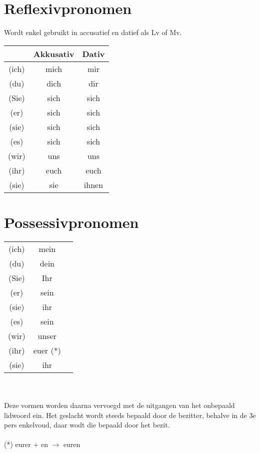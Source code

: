 \documentclass[main.tex]{subfiles}
\begin{document}
\section{Reflexivpronomen}
Wordt enkel gebruikt in accusatief en datief als Lv of Mv.\\
\begin{tabular}{|c|c|c|}
\rowcolor{gray}
\setlength\extrarowheight{8pt}
& Akkusativ & Dativ \\
\hline 
(ich) & mich & mir \\ 
(du) & dich & dir \\ 
(Sie) & sich & sich \\ 
(er) & sich & sich \\ 
(sie) & sich & sich \\ 
(es) & sich & sich \\ 
(wir) & uns & uns \\ 
(ihr) & euch & euch \\ 
(sie) & sie & ihnen \\ 
\hline
\end{tabular} 

\section{Possessivpronomen}
\begin{tabular}{|c|c|c|}
\rowcolor{gray}
(ich) & mein \\ 
(du) & dein \\ 
(Sie) & Ihr \\ 
(er) & sein \\ 
(sie) & ihr \\ 
(es) & sein \\ 
(wir) & unser \\ 
(ihr) & euer (*) \\ 
(sie) & ihr \\ 
\hline
\end{tabular} \\
\\
Deze vormen worden daarna vervoegd met de uitgangen van het onbepaald lidwoord ein.
Het geslacht wordt steeds bepaald door de bezitter, behalve in de 3e pers enkelvoud, daar wodt die bepaald door het bezit.
\\
\\
(*) eurer + en $\rightarrow$ euren
\end{document}
